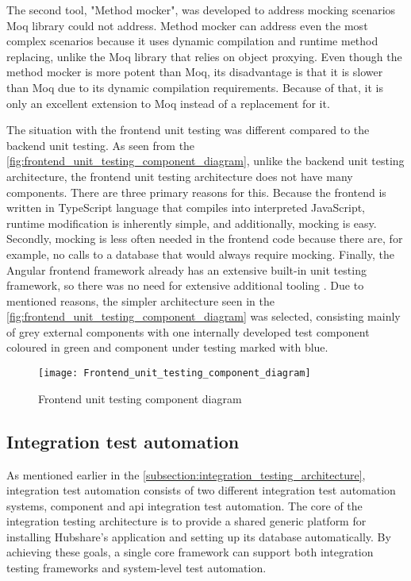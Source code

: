 The second tool, "Method mocker", was developed to address mocking scenarios Moq library could not address. Method mocker can address even the most complex scenarios because it uses dynamic compilation and runtime method replacing, unlike the Moq library that relies on object proxying. Even though the method mocker is more potent than Moq, its disadvantage is that it is slower than Moq due to its dynamic compilation requirements. Because of that, it is only an excellent extension to Moq instead of a replacement for it.

The situation with the frontend unit testing was different compared to the backend unit testing. As seen from the \autoref{fig:frontend_unit_testing_component_diagram}, unlike the backend unit testing architecture, the frontend unit testing architecture does not have many components. There are three primary reasons for this. Because the frontend is written in TypeScript language that compiles into interpreted JavaScript, runtime modification is inherently simple, and additionally, mocking is easy. Secondly, mocking is less often needed in the frontend code because there are, for example, no calls to a database that would always require mocking. Finally, the Angular frontend framework already has an extensive built-in unit testing framework, so there was no need for extensive additional tooling \cite{angular2022testing}. Due to mentioned reasons, the simpler architecture seen in the \autoref{fig:frontend_unit_testing_component_diagram} was selected, consisting mainly of grey external components with one internally developed test component coloured in green and component under testing marked with blue.

\begin{figure}
	\centering
	\texttt{[image: Frontend\_unit\_testing\_component\_diagram]}
	\caption{Frontend unit testing component diagram}
	\label{fig:frontend_unit_testing_component_diagram}
\end{figure}

\FloatBarrier

\subsection{Integration test automation}\label{subsection:integration_test_automation}
As mentioned earlier in the \autoref{subsection:integration_testing_architecture}, integration test automation consists of two different integration test automation systems, component and \gls{api} integration test automation. The core of the integration testing architecture is to provide a shared generic platform for installing Hubshare's application and setting up its database automatically. By achieving these goals, a single core framework can support both integration testing frameworks and system-level test automation.


